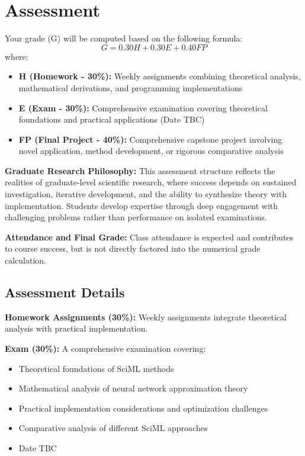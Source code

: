 \documentclass[11pt,fourier]{article}
\begin{document}
	\section*{Assessment}
	Your grade (G) will be computed based on the following formula:
	\[ G = 0.30H + 0.30E + 0.40FP \]
	where:
	\begin{itemize}
		\item \textbf{H (Homework - 30\%):} Weekly assignments combining theoretical analysis, mathematical derivations, and programming implementations
		\item \textbf{E (Exam - 30\%):} Comprehensive examination covering theoretical foundations and practical applications (Date TBC)
		\item \textbf{FP (Final Project - 40\%):} Comprehensive capstone project involving novel application, method development, or rigorous comparative analysis
	\end{itemize}
	
	\textbf{Graduate Research Philosophy:} This assessment structure reflects the realities of graduate-level scientific research, where success depends on sustained investigation, iterative development, and the ability to synthesize theory with implementation. Students develop expertise through deep engagement with challenging problems rather than performance on isolated examinations.
	
	\textbf{Attendance and Final Grade:} Class attendance is expected and contributes to course success, but is not directly factored into the numerical grade calculation.
	
	
	\subsection*{Assessment Details}
	
	\noindent\textbf{Homework Assignments (30\%):} Weekly assignments integrate theoretical analysis with practical implementation.
	
	\noindent\textbf{Exam (30\%):} A comprehensive examination covering:
	\begin{itemize}
		\item Theoretical foundations of SciML methods
		\item Mathematical analysis of neural network approximation theory
		\item Practical implementation considerations and optimization challenges
		\item Comparative analysis of different SciML approaches
		\item Date TBC
	\end{itemize}
	
\end{document}
